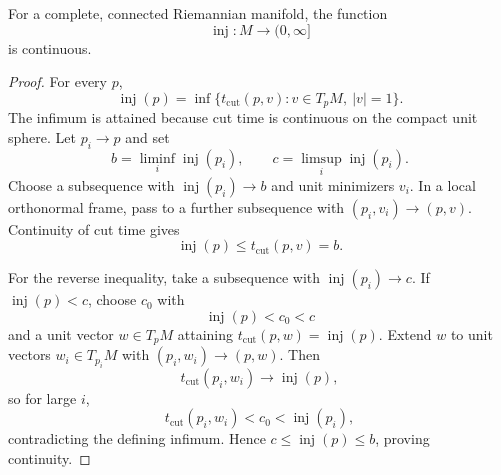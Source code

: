 \begin{proposition}
\label{prop:continuity-injectivity-radius}
For a complete, connected Riemannian manifold, the function
\[
\operatorname{inj}\colon M\longrightarrow(0,\infty]
\]
is continuous.

\begin{proof}
\sketch For every $p$,
\[
\operatorname{inj}(p)
=\inf\{t_{\mathrm{cut}}(p,v):v\in T_pM,\ |v|=1\}.
\]
The infimum is attained because cut time is continuous on the compact unit
sphere. Let $p_i\to p$ and set
\[
b=\liminf_i\operatorname{inj}(p_i),
\qquad
c=\limsup_i\operatorname{inj}(p_i).
\]
Choose a subsequence with $\operatorname{inj}(p_i)\to b$ and unit minimizers
$v_i$. In a local orthonormal frame, pass to a further subsequence with
$(p_i,v_i)\to(p,v)$. Continuity of cut time gives
\[
\operatorname{inj}(p)
\leq t_{\mathrm{cut}}(p,v)
=b.
\]

For the reverse inequality, take a subsequence with
$\operatorname{inj}(p_i)\to c$. If $\operatorname{inj}(p)<c$, choose
$c_0$ with
\[
\operatorname{inj}(p)<c_0<c
\]
and a unit vector $w\in T_pM$ attaining
$t_{\mathrm{cut}}(p,w)=\operatorname{inj}(p)$. Extend $w$ to unit vectors
$w_i\in T_{p_i}M$ with $(p_i,w_i)\to(p,w)$. Then
\[
t_{\mathrm{cut}}(p_i,w_i)\longrightarrow\operatorname{inj}(p),
\]
so for large $i$,
\[
t_{\mathrm{cut}}(p_i,w_i)<c_0<\operatorname{inj}(p_i),
\]
contradicting the defining infimum. Hence
$c\leq\operatorname{inj}(p)\leq b$, proving continuity.
\end{proof}
\end{proposition}
